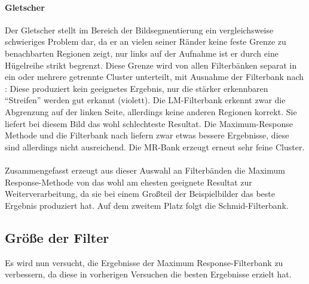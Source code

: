 \paragraph{Gletscher}

Der Gletscher stellt im Bereich der Bildsegmentierung ein vergleichsweise schwieriges Problem dar, da er an vielen seiner Ränder keine feste Grenze zu benachbarten Regionen zeigt, nur links auf der Aufnahme ist er durch eine Hügelreihe strikt begrenzt. Diese Grenze wird von allen Filterbänken separat in ein oder mehrere getrennte Cluster unterteilt, mit Ausnahme der Filterbank nach \cite{jain_91}: Diese produziert kein geeignetes Ergebnis, nur die stärker erkennbaren \enquote{Streifen} werden gut erkannt (violett). Die LM-Filterbank erkennt zwar die Abgrenzung auf der linken Seite, allerdings keine anderen Regionen korrekt. Sie liefert bei diesem Bild das wohl schlechteste Resultat. Die Maximum-Response Methode und die Filterbank nach \cite{schmid_01} liefern zwar etwas bessere Ergebnisse, diese sind allerdings nicht ausreichend. Die MR-Bank erzeugt erneut sehr feine Cluster.

\paragraph{}
Zusammengefasst erzeugt aus dieser Auswahl an Filterbänden die Maximum Response-Methode von \cite{visgeo} das wohl am ehesten geeignete Resultat zur Weiterverarbeitung, da sie bei einem Großteil der Beispielbilder das beste Ergebnis produziert hat. Auf dem zweitem Platz folgt die Schmid-Filterbank.

\subsection{Größe der Filter}
\label{ssec:exp_filtersize}


Es wird nun versucht, die Ergebnisse der Maximum Response-Filterbank zu verbessern, da diese in vorherigen Versuchen die besten Ergebnisse erzielt hat.

